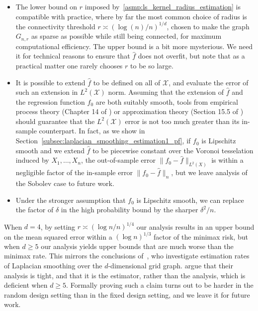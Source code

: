 \documentclass[twoside]{article}
\newcommand{\1}{\mathbf{1}}
\newcommand{\Xset}{\mathcal{X}}
\newcommand{\Leb}{L}
\newcommand{\wh}[1]{\widehat{#1}}
\theoremstyle{definition}
\theoremstyle{remark}
\begin{document}
\begin{itemize}
	\item The lower bound on $r$ imposed by~\ref{asmp:ls_kernel_radius_estimation} is  compatible with practice, where by far the most common choice of radius is the connectivity threshold $r \asymp (\log(n)/n)^{1/d}$, chosen to make the graph $G_{n,r}$ as sparse as possible while still being connected, for maximum computational efficiency. The upper bound is a bit more mysterious. We need it for technical reasons to ensure that $\wh{f}$ does not overfit, but note that as a practical matter one rarely chooses $r$ to be so large.
	\item It is possible to extend $\wh{f}$ to be defined on all of $\Xset$, and evaluate the error of such an extension in $\Leb^2(\Xset)$ norm. Assuming that the extension of $\wh{f}$ and the regression function $f_0$ are both suitably smooth, tools from empirical process theory (Chapter 14 of \citet{wainwright2019}) or approximation theory (Section 15.5 of \citet{johnstone2011}) should guarantee that the $\Leb^2(\Xset)$ error is not too much greater than its in-sample counterpart. In fact, as we show in Section~\ref{subsec:laplacian_smoothing_estimation1_pf}, if $f_0$ is Lipschitz smooth and we extend $\wh{f}$ to be piecewise constant over the Voronoi tesselation induced by $X_1,\ldots,X_n$, the out-of-sample error $\|f_0 - \wh{f}\|_{\Leb^2(X)}$ is within a negligible factor of the in-sample error $\|f_0 - \wh{f}\|_n$, but we leave analysis of the Sobolev case to future work.
	\item Under the stronger assumption that $f_0$ is Lipschitz smooth, we can replace the factor of $\delta$ in the high probability bound by the sharper $\delta^2/n$.
\end{itemize} 

When $d = 4$, by setting $r \asymp (\log n/n)^{1/4}$ our analysis results in an upper bound on the mean squared error within a $(\log n)^{1/3}$ factor of the minimax risk, but when $d \geq 5$ our analysis yields upper bounds that are much worse than the minimax rate. This mirrors the conclusions of~\citet{sadhanala16}, who investigate estimation rates of Laplacian smoothing over the $d$-dimensional grid graph. \citet{sadhanala16} argue that their analysis is tight, and that it is the estimator, rather than the analysis, which is deficient when $d \geq 5$. Formally proving such a claim turns out to be harder in the random design setting than in the fixed design setting, and we leave it for future work. 
\end{document}
